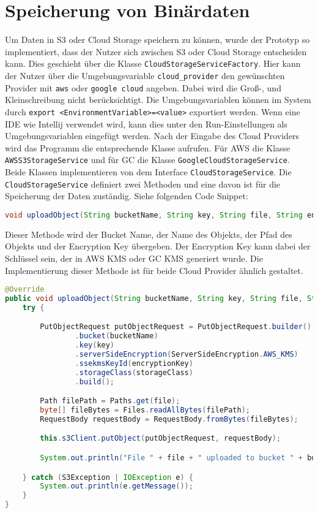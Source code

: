 \newpage

\section{Speicherung von Binärdaten}

Um Daten in S3 oder Cloud Storage speichern zu können, wurde der Prototyp so implementiert, dass der Nutzer sich zwischen S3 oder Cloud Storage entscheiden kann. Dies geschieht über die Klasse \verb|CloudStorageServiceFactory|. Hier kann der Nutzer über die Umgebungsvariable \verb|cloud_provider| den gewünschten Provider mit \verb|aws| oder \verb|google cloud| angeben. Dabei wird die Groß-, und Kleinschreibung nicht berücksichtigt. Die Umgebungsvariablen können im System durch \verb|export <EnvironmentVariable>=<value>| exportiert werden. Wenn eine IDE wie Intellij verwendet wird, kann dies unter den Run-Einstellungen als Umgebungsvariablen eingefügt werden. Nach der Eingabe des Cloud Providers wird das Programm die entsprechende Klasse aufrufen. Für AWS die Klasse \verb|AWSS3StorageService| und für GC die Klasse \verb|GoogleCloudStorageService|. Beide Klassen implementieren von dem Interface \verb|CloudStorageService|. Die \verb|CloudStorageService| definiert zwei Methoden und eine davon ist für die Speicherung der Daten zuständig. Siehe folgenden Code Snippet:

\begin{lstlisting}[language=Java]
void uploadObject(String bucketName, String key, String file, String encryptionKey) throws IOException;
\end{lstlisting}
	
Dieser Methode wird der Bucket Name, der Name des Objekts, der Pfad des Objekts und der Encryption Key übergeben. Der Encryption Key kann dabei der Schlüssel sein, der in AWS KMS oder GC KMS generiert wurde. Die Implementierung dieser Methode ist für beide Cloud Provider ähnlich gestaltet.

\begin{lstlisting}[language=Java, caption=Prototyp Code Snippet - Hochladen eines Objekts nach S3]
@Override
public void uploadObject(String bucketName, String key, String file, String encryptionKey, String storageClass) {
    try {

        PutObjectRequest putObjectRequest = PutObjectRequest.builder()
                .bucket(bucketName)
                .key(key)
                .serverSideEncryption(ServerSideEncryption.AWS_KMS)
                .ssekmsKeyId(encryptionKey)
                .storageClass(storageClass)
                .build();

        Path filePath = Paths.get(file);
        byte[] fileBytes = Files.readAllBytes(filePath);
        RequestBody requestBody = RequestBody.fromBytes(fileBytes);

        this.s3Client.putObject(putObjectRequest, requestBody);

        System.out.println("File " + file + " uploaded to bucket " + bucketName + " as " + key);

    } catch (S3Exception | IOException e) {
        System.out.println(e.getMessage());
    }
}
\end{lstlisting}

